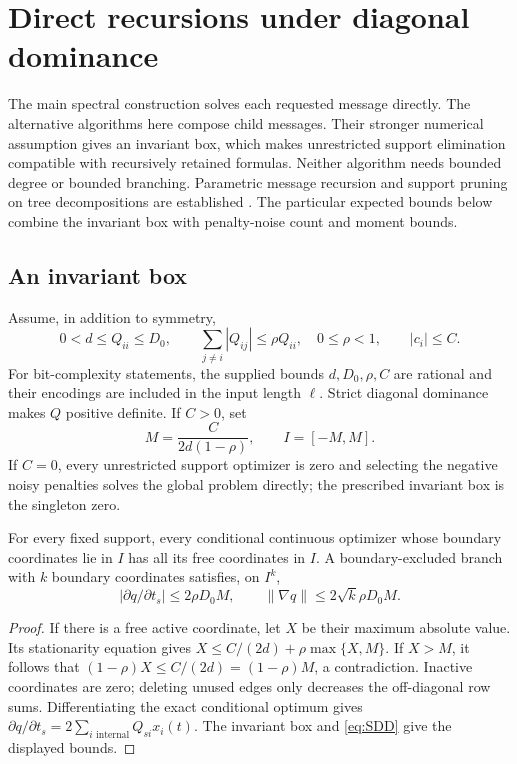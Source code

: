 \section{Direct recursions under diagonal dominance}\label{sec:recursive}
The main spectral construction solves each requested message directly.
The alternative algorithms here compose child messages. Their stronger
numerical assumption gives an invariant box, which makes unrestricted
support elimination compatible with recursively retained formulas.
Neither algorithm needs bounded degree or bounded branching. Parametric
message recursion and support pruning on tree decompositions are established
\cite{BhathenaTrees,BhathenaStructured}. The particular expected bounds below
combine the invariant box with penalty-noise count and moment bounds.

\subsection{An invariant box}
Assume, in addition to symmetry,
\begin{equation}\label{eq:SDD}
 0<d\le Q_{ii}\le D_0,\qquad
 \sum_{j\ne i}|Q_{ij}|\le\rho Q_{ii},\quad 0\le\rho<1,
 \qquad |c_i|\le C.
\end{equation}
For bit-complexity statements, the supplied bounds $d,D_0,\rho,C$ are
rational and their encodings are included in the input length $\ell$.
Strict diagonal dominance makes $Q$ positive definite. If $C>0$, set
\begin{equation}\label{eq:SDDbox}
 M=\frac{C}{2d(1-\rho)},\qquad I=[-M,M].
\end{equation}
If $C=0$, every unrestricted support optimizer is zero and selecting the
negative noisy penalties solves the global problem directly; the prescribed
invariant box is the singleton zero.

\begin{lemma}\label{lem:invariant}
For every fixed support, every conditional continuous optimizer whose
boundary coordinates lie in $I$ has all its free coordinates in $I$.
A boundary-excluded branch with $k$ boundary coordinates satisfies, on $I^k$,
\[
 |\partial q/\partial t_s|\le2\rho D_0M,
 \qquad \|\nabla q\|\le2\sqrt{k}\rho D_0M.
\]
\end{lemma}
\begin{proof}
If there is a free active coordinate, let $X$ be their maximum absolute
value. Its stationarity equation gives
$X\le C/(2d)+\rho\max\{X,M\}$. If $X>M$, it follows that
$(1-\rho)X\le C/(2d)=(1-\rho)M$, a contradiction. Inactive coordinates
are zero; deleting unused edges only decreases the off-diagonal row sums.
Differentiating the exact conditional optimum gives
$\partial q/\partial t_s=2\sum_{i\text{ internal}}Q_{si}x_i(t)$.
The invariant box and \eqref{eq:SDD} give the displayed bounds.
\end{proof}

